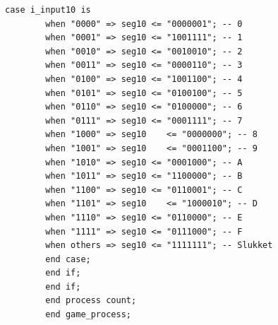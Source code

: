 \begin{enumerate}
\begin{lstlisting}[caption={Behavioral style kode for Guessgame},label={lst:Guessgame2pl}]
		case i_input10 is
		when "0000" => seg10 <= "0000001"; -- 0
		when "0001" => seg10 <= "1001111"; -- 1
		when "0010" => seg10 <= "0010010"; -- 2
		when "0011" => seg10 <= "0000110"; -- 3
		when "0100" => seg10 <= "1001100"; -- 4
		when "0101" => seg10 <= "0100100"; -- 5
		when "0110" => seg10 <= "0100000"; -- 6
		when "0111" => seg10 <= "0001111"; -- 7
		when "1000" => seg10	<= "0000000"; -- 8
		when "1001" => seg10	<= "0001100"; -- 9
		when "1010" => seg10 <= "0001000"; -- A
		when "1011" => seg10 <= "1100000"; -- B
		when "1100" => seg10 <= "0110001"; -- C
		when "1101" => seg10	<= "1000010"; -- D
		when "1110" => seg10 <= "0110000"; -- E
		when "1111" => seg10 <= "0111000"; -- F
		when others => seg10 <= "1111111"; -- Slukket
		end case;
		end if;
		end if;
		end process count;
		end game_process;
		
		
		

\end{lstlisting}
\end{enumerate}
